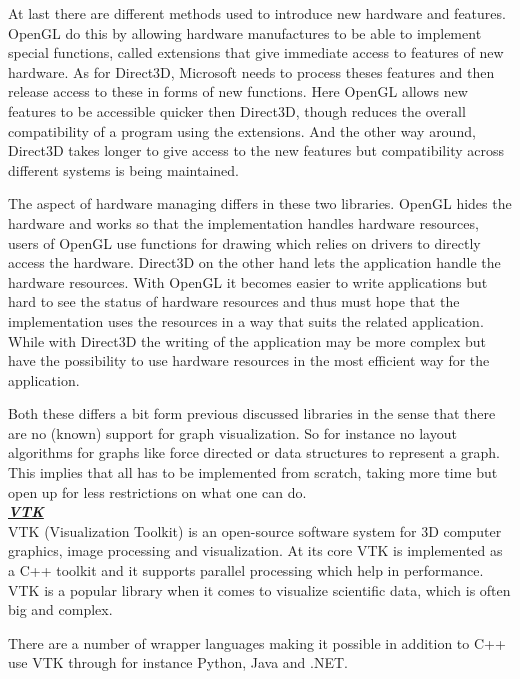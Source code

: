 \documentclass[a4paper,11pt]{kth-mag}
\begin{document}
\begin{appendices}
At last there are different methods used to introduce new hardware and features. OpenGL do this by allowing hardware manufactures 
to be able to implement special functions, called extensions that give immediate access to features of new hardware. As for Direct3D,  Microsoft needs to process theses features and then release 
access to these in forms of new functions. Here OpenGL allows new features to be accessible quicker then Direct3D, though reduces the overall compatibility of a program using the extensions. 
And the other way around, Direct3D takes longer to give access to the new features but compatibility across different systems is being maintained.

The aspect of hardware managing differs in these two libraries.
OpenGL hides the hardware and works so that the implementation handles hardware resources, users of OpenGL use functions for drawing which relies on drivers to directly access the hardware. Direct3D on
the other hand lets the application handle the hardware resources. With OpenGL it becomes easier to write applications but hard to see the status of hardware resources and
thus must hope that the implementation uses the resources in a way that suits the related application. While with Direct3D the writing of the application may be more complex but have the possibility to use 
hardware resources in the most efficient way for the application.\cite{website:wisegeek}

Both these differs a bit form previous discussed libraries in the sense that there are no (known) support for graph visualization. 
So for instance no layout algorithms for graphs like force directed or data structures to represent a graph. This implies that all has to be implemented from scratch, taking more time but open
up for less restrictions on what one can do.\\
\newline
\textbf{\textit{\underline{VTK}}}\\
\newline
VTK (Visualization Toolkit)\cite{website:vtk} is an open-source software system for 3D computer graphics, image processing and visualization. At its core VTK is implemented as a C++ toolkit and it supports parallel
 processing which help in performance. VTK is a popular library when it comes to visualize scientific data, which is often big and complex. 
 
There are a number of wrapper languages making it possible in addition to C++ use VTK through for instance  Python, Java and .NET.\\

\end{appendices}
\end{document}
